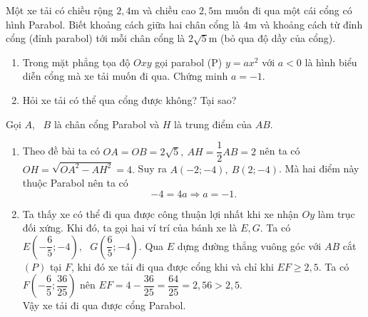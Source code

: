 \begin{ex}%
Một xe tải có chiều rộng $2,4$m và chiều cao $2,5$m muốn đi qua một cái cổng có hình Parabol. Biết khoảng cách giữa hai chân cổng là $4$m và khoảng cách từ đỉnh cổng (đỉnh parabol) tới mỗi chân cổng là $2\sqrt{5}$m (bỏ qua độ dầy của cổng).
\begin{enumerate}
\item Trong mặt phẳng tọa độ $Oxy$ gọi parabol (P) $y=ax^2$ với $a < 0$ là hình biểu diễn cổng mà xe tải muốn đi qua. Chứng minh $a = -1$.
\item Hỏi xe tải có thể qua cổng được không? Tại sao?
\end{enumerate}
\loigiai
    {
Gọi $A,\text{ }B$ là chân cổng Parabol và $H$ là trung điểm của $AB$.
\begin{center}
\end{center}
\begin{enumerate}
\item Theo đề bài ta có $OA=OB=2\sqrt{5},\ AH=\dfrac{1}{2}AB=2$ nên ta có
$OH=\sqrt{OA^2-AH^2}=4.$
Suy ra $A\left({-2;-4}\right),\ B\left({2;-4}\right)$. Mà hai điểm này thuộc Parabol nên ta có 
$$-4=4a\Rightarrow a=-1.$$
\item Ta thấy xe có thể đi qua được công thuận lợi nhất khi xe nhận $Oy$ làm trục đối xứng. Khi đó, ta gọi hai ví trí của bánh xe là $E,G$. Ta có $E\left({-\dfrac{6}{5};-4}\right),\text{ }G\left({\dfrac{6}{5};-4}\right)$. Qua $E$ dựng đường thẳng vuông góc với $AB$ cắt $\left(P\right)$ tại $F$, khi đó xe tải đi qua được cổng khi và chỉ khi $EF\geqslant 2,5$.
Ta có $F\left({-\dfrac{6}{5};\dfrac{36}{25}}\right)$ nên $EF=4-\dfrac{36}{25}=\dfrac{64}{25}=2,56>2,5$.\\
Vậy xe tải đi qua được cổng Parabol. 
\end{enumerate}
    }
\end{ex}

